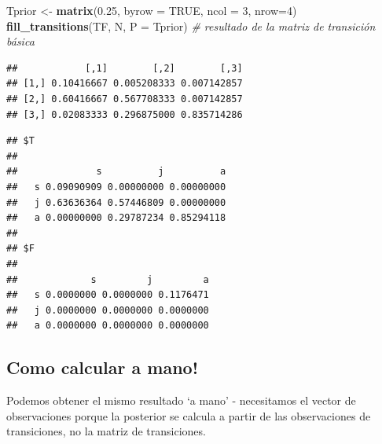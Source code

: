 \documentclass[
]{book}
\newenvironment{Shaded}{\begin{snugshade}}{\end{snugshade}}
\newcommand{\AttributeTok}[1]{\textcolor[rgb]{0.13,0.29,0.53}{#1}}
\newcommand{\CommentTok}[1]{\textcolor[rgb]{0.56,0.35,0.01}{\textit{#1}}}
\newcommand{\ConstantTok}[1]{\textcolor[rgb]{0.56,0.35,0.01}{#1}}
\newcommand{\DecValTok}[1]{\textcolor[rgb]{0.00,0.00,0.81}{#1}}
\newcommand{\FloatTok}[1]{\textcolor[rgb]{0.00,0.00,0.81}{#1}}
\newcommand{\FunctionTok}[1]{\textcolor[rgb]{0.13,0.29,0.53}{\textbf{#1}}}
\newcommand{\NormalTok}[1]{#1}
\newcommand{\OtherTok}[1]{\textcolor[rgb]{0.56,0.35,0.01}{#1}}
\theoremstyle{definition}
\theoremstyle{definition}
\theoremstyle{definition}
\theoremstyle{definition}
\theoremstyle{remark}
\begin{document}
\begin{Shaded}
\begin{Highlighting}[]
\NormalTok{Tprior }\OtherTok{\textless{}{-}} \FunctionTok{matrix}\NormalTok{(}\FloatTok{0.25}\NormalTok{, }\AttributeTok{byrow =} \ConstantTok{TRUE}\NormalTok{, }\AttributeTok{ncol =} \DecValTok{3}\NormalTok{, }\AttributeTok{nrow=}\DecValTok{4}\NormalTok{)}
\FunctionTok{fill\_transitions}\NormalTok{(TF, N, }\AttributeTok{P =}\NormalTok{ Tprior) }\CommentTok{\# resultado de la matriz de transición básica}
\end{Highlighting}
\end{Shaded}

\begin{verbatim}
##            [,1]        [,2]        [,3]
## [1,] 0.10416667 0.005208333 0.007142857
## [2,] 0.60416667 0.567708333 0.007142857
## [3,] 0.02083333 0.296875000 0.835714286
\end{verbatim}

\begin{Shaded}
\end{Shaded}

\begin{verbatim}
## $T
##    
##              s          j          a
##   s 0.09090909 0.00000000 0.00000000
##   j 0.63636364 0.57446809 0.00000000
##   a 0.00000000 0.29787234 0.85294118
## 
## $F
##    
##             s         j         a
##   s 0.0000000 0.0000000 0.1176471
##   j 0.0000000 0.0000000 0.0000000
##   a 0.0000000 0.0000000 0.0000000
\end{verbatim}

\hypertarget{como-calcular-a-mano}{%
\subsection{Como calcular a mano!}\label{como-calcular-a-mano}}

Podemos obtener el mismo resultado `a mano' - necesitamos el vector de
observaciones porque la posterior se calcula a partir de las
observaciones de transiciones, no la matriz de transiciones.
\end{document}
